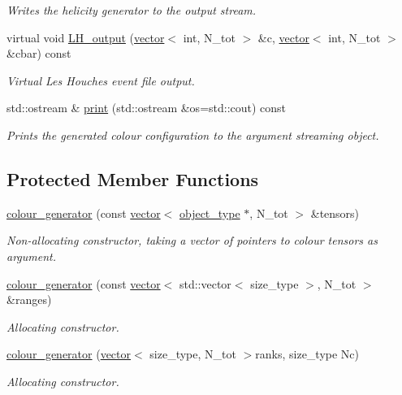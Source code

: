 \begin{DoxyCompactItemize}
\begin{DoxyCompactList}\small\item\em Writes the helicity generator to the output stream. \end{DoxyCompactList}\item 
\hypertarget{a00084_a192e163e0209a44fbef5a4ec6cade925}{virtual void \hyperlink{a00084_a192e163e0209a44fbef5a4ec6cade925}{L\-H\-\_\-output} (\hyperlink{a00559}{vector}$<$ int, N\-\_\-tot $>$ \&c, \hyperlink{a00559}{vector}$<$ int, N\-\_\-tot $>$ \&cbar) const }\label{a00084_a192e163e0209a44fbef5a4ec6cade925}

\begin{DoxyCompactList}\small\item\em Virtual Les Houches event file output. \end{DoxyCompactList}\item 
std\-::ostream \& \hyperlink{a00084_adcd79837d379ebe03c744ec7cf5e7ca3}{print} (std\-::ostream \&os=std\-::cout) const 
\begin{DoxyCompactList}\small\item\em Prints the generated colour configuration to the argument streaming object. \end{DoxyCompactList}\end{DoxyCompactItemize}
\subsection*{Protected Member Functions}
\begin{DoxyCompactItemize}
\item 
\hyperlink{a00084_ab6b2c982b0f27ca8d2ffa744ca25b6ff}{colour\-\_\-generator} (const \hyperlink{a00559}{vector}$<$ \hyperlink{a00526}{object\-\_\-type} $\ast$, N\-\_\-tot $>$ \&tensors)
\begin{DoxyCompactList}\small\item\em Non-\/allocating constructor, taking a vector of pointers to colour tensors as argument. \end{DoxyCompactList}\item 
\hyperlink{a00084_a3e163e543ea1f6afd5c9a749298b528e}{colour\-\_\-generator} (const \hyperlink{a00559}{vector}$<$ std\-::vector$<$ size\-\_\-type $>$, N\-\_\-tot $>$ \&ranges)
\begin{DoxyCompactList}\small\item\em Allocating constructor. \end{DoxyCompactList}\item 
\hyperlink{a00084_a8546e9ed5da4e0b2c824c5022bf6395c}{colour\-\_\-generator} (\hyperlink{a00559}{vector}$<$ size\-\_\-type, N\-\_\-tot $>$ranks, size\-\_\-type Nc)
\begin{DoxyCompactList}\small\item\em Allocating constructor. \end{DoxyCompactList}\end{DoxyCompactItemize}


